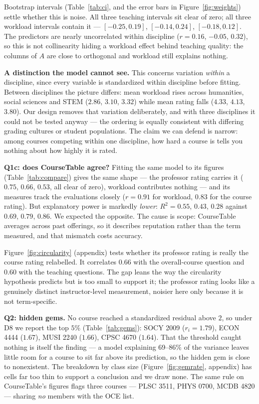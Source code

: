 \documentclass[11pt]{article}
\begin{document}
Bootstrap intervals (Table~\ref{tab:ci}, and the error bars in
Figure~\ref{fig:weights}) settle whether this is noise. All three teaching
intervals sit clear of zero; all three workload intervals contain it ---
$[-0.25, 0.19]$, $[-0.14, 0.24]$, $[-0.18, 0.12]$. The predictors are nearly
uncorrelated within discipline ($r = 0.16$, $-0.05$, $0.32$), so this is not
collinearity hiding a workload effect behind teaching quality: the columns of
$A$ are close to orthogonal and workload still explains nothing.

\textbf{A distinction the model cannot see.} This concerns variation
\emph{within} a discipline, since every variable is standardized within
discipline before fitting. Between disciplines the picture differs: mean
workload rises across humanities, social sciences and STEM ($2.86$, $3.10$,
$3.32$) while mean rating falls ($4.33$, $4.13$, $3.80$). Our design removes
that variation deliberately, and with three disciplines it could not be tested
anyway --- the ordering is equally consistent with differing grading cultures or
student populations. The claim we can defend is narrow: among courses competing
within one discipline, how hard a course is tells you nothing about how highly
it is rated.

\textbf{Q1c: does CourseTable agree?} Fitting the same model to its figures
(Table~\ref{tab:compare}) gives the same shape --- the professor rating carries
it ($0.75$, $0.66$, $0.53$, all clear of zero), workload contributes nothing ---
and its measures track the evaluations closely ($r = 0.91$ for workload, $0.83$
for the course rating). But explanatory power is markedly \emph{lower}:
$R^2 = 0.55$, $0.43$, $0.28$ against $0.69$, $0.79$, $0.86$. We expected the
opposite. The cause is scope: CourseTable averages across past offerings, so it
describes reputation rather than the term measured, and that mismatch costs
accuracy.

Figure~\ref{fig:circularity} (appendix) tests whether its professor rating is
really the course rating relabelled. It correlates $0.66$ with the overall-course question
and $0.60$ with the teaching questions. The gap leans the way the circularity
hypothesis predicts but is too small to support it; the professor rating looks
like a genuinely distinct instructor-level measurement, noisier here only
because it is not term-specific.

\textbf{Q2: hidden gems.} No course reached a standardized residual above $2$,
so under D8 we report the top $5\%$ (Table~\ref{tab:gems}): SOCY 2009
($r_i = 1.79$), ECON 4444 ($1.67$), MUSI 2240 ($1.66$), CPSC 4670 ($1.64$).
That the threshold caught nothing is itself the finding --- a model explaining
69--86\% of the variance leaves little room for a course to sit far above its
prediction, so the hidden gem is close to nonexistent. The breakdown by class
size (Figure~\ref{fig:gemrate}, appendix) has cells far too thin to support a
conclusion and we draw none. The same rule on CourseTable's figures flags three
courses --- PLSC 3511, PHYS 0700, MCDB 4820 --- sharing \emph{no} members with
the OCE list.
\end{document}
